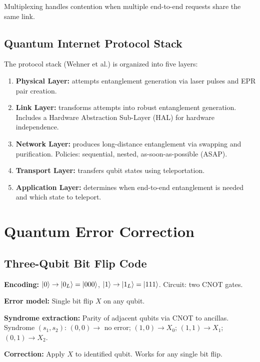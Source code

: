 \documentclass[10pt,a4paper]{article}
\begin{document}
Multiplexing handles contention when multiple end-to-end requests share the same link.

\subsection{Quantum Internet Protocol Stack}

The protocol stack (Wehner et al.) is organized into five layers:
\begin{enumerate}[nosep]
\item \textbf{Physical Layer:} attempts entanglement generation via laser pulses and EPR pair creation.
\item \textbf{Link Layer:} transforms attempts into robust entanglement generation. Includes a Hardware Abstraction Sub-Layer (HAL) for hardware independence.
\item \textbf{Network Layer:} produces long-distance entanglement via swapping and purification. Policies: sequential, nested, as-soon-as-possible (ASAP).
\item \textbf{Transport Layer:} transfers qubit states using teleportation.
\item \textbf{Application Layer:} determines when end-to-end entanglement is needed and which state to teleport.
\end{enumerate}

\newpage

\section{Quantum Error Correction}

\subsection{Three-Qubit Bit Flip Code}

\begin{tcolorbox}[algostyle, title={Algorithm: 3-Qubit Bit Flip Code}]
\textbf{Encoding:} $\ket{0}\to\ket{0_L}=\ket{000}$, $\ket{1}\to\ket{1_L}=\ket{111}$. Circuit: two CNOT gates.

\textbf{Error model:} Single bit flip $X$ on any qubit.

\textbf{Syndrome extraction:} Parity of adjacent qubits via CNOT to ancillas.
Syndrome $(s_1,s_2)$: $(0,0)\to$ no error; $(1,0)\to X_0$; $(1,1)\to X_1$; $(0,1)\to X_2$.

\textbf{Correction:} Apply $X$ to identified qubit. Works for any single bit flip.
\end{tcolorbox}
\end{document}
